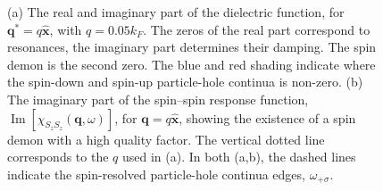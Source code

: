 \documentclass[aps,prl,reprint,twocolumns,superscriptaddress]{revtex4-2}
\DeclareMathOperator{\Imm}{Im}
\newcommand{\xx}{\hat{\bm{x}}}
\newcommand{\kF}{k_{F}}
\newenvironment{DIFnomarkup}{}{}
\begin{document}
\begin{DIFnomarkup}
	
	\begin{figure}
		\caption{(a) The real and imaginary part of the dielectric function, for $\bm q^* = q \hat{\bm x}$, with $q=0.05\kF$. The zeros of the real part correspond to resonances, the imaginary part determines their damping. The spin demon is the second zero. The blue and red shading indicate where the spin-down and spin-up particle-hole continua is non-zero. (b)  The imaginary part of the spin–spin response function, $\Imm[\chi_{S_zS_z}(\bm q,\omega)]$, for $\bm q=q\xx$, showing the existence of a spin demon with a high quality factor. The vertical dotted line corresponds to the $q$ used in (a). In both (a,b), the dashed lines indicate the spin-resolved particle-hole continua edges, $\omega_{+\sigma}$.\label{fig:alongx} }
	\end{figure}
	\end{DIFnomarkup}
	
\end{document}
